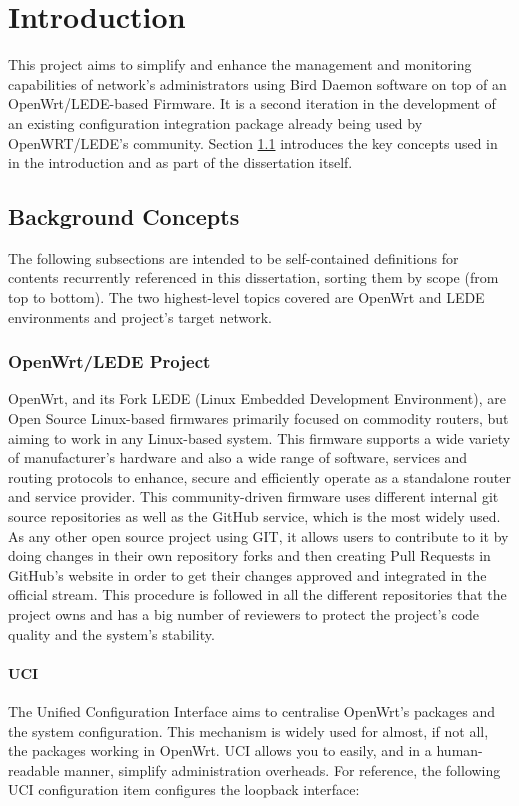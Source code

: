 \chapter{Introduction}
\label{ch:introduction}
\pagestyle{headings}

This project aims to simplify and enhance the management and monitoring capabilities of network's administrators using Bird Daemon software on top of an OpenWrt/LEDE-based Firmware. It is a second iteration in the development of an existing configuration integration package already being used by OpenWRT/LEDE's community. Section \ref{ch:backc} introduces the key concepts used in in the introduction and as part of the dissertation itself.

\section{Background Concepts}
\label{ch:backc}
The following subsections are intended to be self-contained definitions for contents recurrently referenced in this dissertation, sorting them by scope (from top to bottom). The two highest-level topics covered are OpenWrt and LEDE environments and project's target network.
\subsection{OpenWrt/LEDE Project}
\label{subsec:owrtlp}
OpenWrt, and its Fork LEDE (Linux Embedded Development Environment), are Open Source Linux-based firmwares primarily focused on commodity routers, but aiming to work in any Linux-based system. This firmware supports a wide variety of manufacturer's hardware and also a wide range of software, services and routing protocols to enhance, secure and efficiently operate as a standalone router and service provider. This community-driven firmware uses different internal \Gls{git} source repositories as well as the GitHub service, which is the most widely used. As any other open source project using GIT, it allows users to contribute to it by doing changes in their own repository forks and then creating Pull Requests in GitHub's website in order to get their changes approved and integrated in the official stream. This procedure is followed in all the different repositories that the project owns and has a big number of reviewers to protect the project's code quality and the system's stability.

\subsubsection{UCI}
The Unified Configuration Interface aims to centralise OpenWrt's packages and the system configuration. This mechanism is widely used for almost, if not all, the packages working in OpenWrt. UCI allows you to easily, and in a human-readable manner, simplify administration overheads. For reference, the following UCI configuration item configures the loopback interface: 

